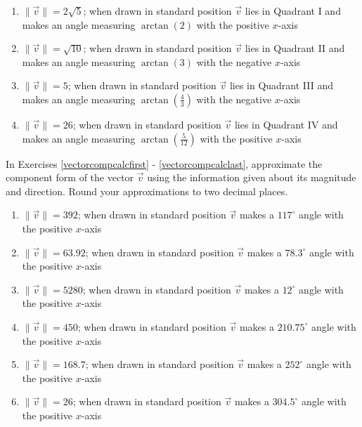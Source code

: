 \begin{enumerate}
\item $\| \vec{v}\| = 2\sqrt{5}$; when drawn in standard position $\vec{v}$ lies in Quadrant I and makes an angle measuring $\arctan(2)$ with the positive $x$-axis

\item $\| \vec{v}\| = \sqrt{10}$; when drawn in standard position $\vec{v}$ lies in Quadrant II and makes an angle measuring $\arctan(3)$ with the negative $x$-axis

\item $\| \vec{v}\| = 5$; when drawn in standard position $\vec{v}$ lies in Quadrant III and makes an angle measuring $\arctan\left(\frac{4}{3}\right)$ with the negative $x$-axis

\item $\| \vec{v}\| = 26$; when drawn in standard position $\vec{v}$ lies in Quadrant IV and makes an angle measuring $\arctan\left(\frac{5}{12}\right)$ with the positive $x$-axis \label{vectorcomplast}

\setcounter{HW}{\value{enumi}}

\end{enumerate}

In Exercises \ref{vectorcompcalcfirst} - \ref{vectorcompcalclast}, approximate the component form of the vector $\vec{v}$ using the information given about its magnitude and direction.  Round your approximations to two decimal places.

\begin{enumerate}

\setcounter{enumi}{\value{HW}}

\item $\|\vec{v}\| = 392$; when drawn in standard position $\vec{v}$ makes a $117^{\circ}$ angle with the positive $x$-axis \label{vectorcompcalcfirst}

\item $\|\vec{v}\| = 63.92$; when drawn in standard position $\vec{v}$ makes a $78.3^{\circ}$ angle with the positive $x$-axis

\item $\|\vec{v}\| = 5280$; when drawn in standard position $\vec{v}$ makes a $12^{\circ}$ angle with the positive $x$-axis 

\item $\|\vec{v}\| = 450$; when drawn in standard position $\vec{v}$ makes a $210.75^{\circ}$ angle with the positive $x$-axis 

\item $\|\vec{v}\| = 168.7$; when drawn in standard position $\vec{v}$ makes a $252^{\circ}$ angle with the positive $x$-axis

\item $\| \vec{v}\| = 26$; when drawn in standard position $\vec{v}$ makes a $304.5^{\circ}$ angle with the positive $x$-axis \label{vectorcompcalclast}

\setcounter{HW}{\value{enumi}}

\end{enumerate}

